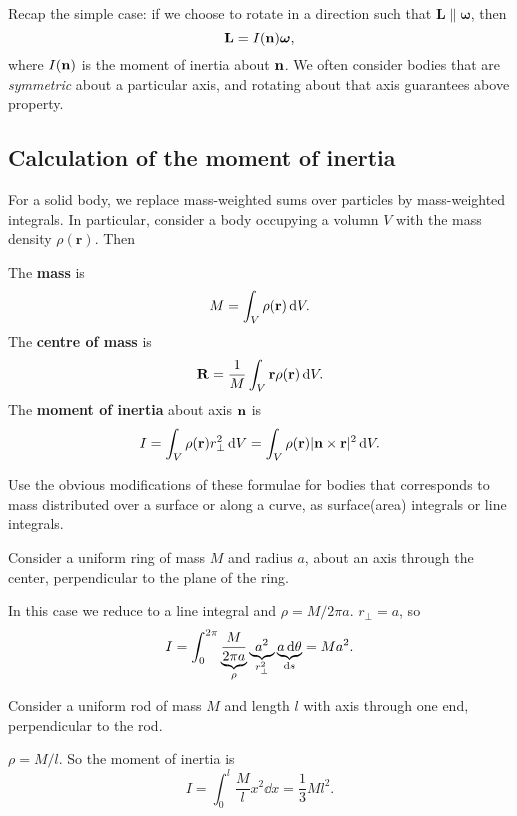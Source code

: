 Recap the simple case: if we choose to rotate in a direction such that $ \mathbf{L}\parallel \boldsymbol\omega $, then 
\[
    {\bf L} = I({\bf n}) \boldsymbol{\omega},
\]
where $ I({\bf n}) $ is the moment of inertia about ${\bf n}$. We often consider bodies that are \textit{symmetric} about a particular axis, and rotating about that axis guarantees above property. 

\subsection{Calculation of the moment of inertia}
For a solid body, we replace mass-weighted sums over particles by mass-weighted integrals. In particular, consider a body occupying a volumn $V$ with the mass density $\rho(\mathbf{r})$. Then 
\begin{definition}
    The \textbf{mass} is
    \[
      M = \int_V \rho(\mathbf{r}) \,\mathrm{d} V.
    \]
    The \textbf{centre of mass} is
    \[
      \mathbf{R} = \frac{1}{M}\int_V \mathbf{r}\rho(\mathbf{r})\,\mathrm{d} V.
    \]
    The \textbf{moment of inertia} about axis ${\bf n}$ is
    \[
      I = \int_V \rho(\mathbf{r}) r_{\perp}^2 \,\mathrm{d} V = \int_V \rho(\mathbf{r})|\mathbf{n}\times \mathbf{r}|^2\,\mathrm{d} V.
    \]
\end{definition}
Use the obvious modifications of these formulae for bodies that corresponds to mass distributed over a surface or along a curve, as surface(area) integrals or line integrals.

\begin{example}
    Consider a uniform ring of mass $M$ and radius $a$, about an axis through the center, perpendicular to the plane of the ring.
    \begin{center}
    \end{center}
    In this case we reduce to a line integral and $ \rho = M/2\pi a $. $ r_{\perp }=a $, so 
    \[
      I = \int_{0}^{2\pi} \underbrace{\frac{M}{2\pi a}}_{\rho} \underbrace{a^2}_{r_{\perp}^2} \underbrace{a \,\mathrm{d} \theta}_{\mathrm{d} s}= Ma^2.
    \]
\end{example}

\begin{example}
    Consider a uniform rod of mass $M$ and length $l$ with axis through one end, perpendicular to the rod.
    \begin{center}
    \end{center}
    $\rho = M/l$. So the moment of inertia is
    \[
      I = \int_0 ^l \frac{M}{l}x^2\dd x = \frac{1}{3}Ml^2.
    \]
\end{example}